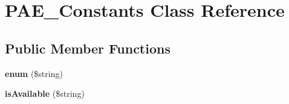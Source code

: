 \hypertarget{class_p_a_e___constants}{\section{P\+A\+E\+\_\+\+Constants Class Reference}
\label{class_p_a_e___constants}
}
\subsection*{Public Member Functions}
\begin{DoxyCompactItemize}
\item 
\hypertarget{class_p_a_e___constants_a7967c6e825979f8b2faefba3d95c3821}{{\bfseries enum} (\$string)}\label{class_p_a_e___constants_a7967c6e825979f8b2faefba3d95c3821}

\item 
\hypertarget{class_p_a_e___constants_a30537daeb912ea3e348c579c4f930841}{{\bfseries is\+Available} (\$string)}\label{class_p_a_e___constants_a30537daeb912ea3e348c579c4f930841}

\end{DoxyCompactItemize}
